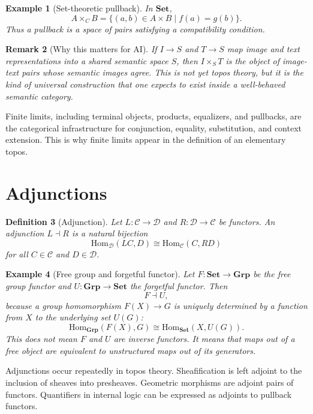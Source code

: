 \documentclass[11pt]{article}
\newtheorem{definition}{Definition}[section]
\newtheorem{remark}[definition]{Remark}
\newtheorem{example}[definition]{Example}
\newcommand{\Set}{\mathbf{Set}}
\newcommand{\Grp}{\mathbf{Grp}}
\newcommand{\Hom}{\mathrm{Hom}}
\begin{document}
\begin{example}[Set-theoretic pullback]
In \(\Set\),
\[
A\times_C B=\{(a,b)\in A\times B\mid f(a)=g(b)\}.
\]
Thus a pullback is a space of pairs satisfying a compatibility condition.
\end{example}

\begin{remark}[Why this matters for AI]
If \(I\to S\) and \(T\to S\) map image and text representations into a shared
semantic space \(S\), then \(I\times_S T\) is the object of image-text pairs
whose semantic images agree. This is not yet topos theory, but it is the kind of
universal construction that one expects to exist inside a well-behaved semantic
category.
\end{remark}

Finite limits, including terminal objects, products, equalizers, and pullbacks,
are the categorical infrastructure for conjunction, equality, substitution, and
context extension. This is why finite limits appear in the definition of an
elementary topos.

\section{Adjunctions}

\begin{definition}[Adjunction]
Let \(L:\mathcal C\to\mathcal D\) and \(R:\mathcal D\to\mathcal C\) be functors.
An adjunction \(L\dashv R\) is a natural bijection
\[
\Hom_{\mathcal D}(L C,D)\cong \Hom_{\mathcal C}(C,RD)
\]
for all \(C\in\mathcal C\) and \(D\in\mathcal D\).
\end{definition}

\begin{example}[Free group and forgetful functor]
Let \(F:\Set\to\Grp\) be the free group functor and
\(U:\Grp\to\Set\) the forgetful functor. Then
\[
F\dashv U,
\]
because a group homomorphism \(F(X)\to G\) is uniquely determined by a function
from \(X\) to the underlying set \(U(G)\):
\[
\Hom_{\Grp}(F(X),G)\cong \Hom_{\Set}(X,U(G)).
\]
This does not mean \(F\) and \(U\) are inverse functors. It means that maps out
of a free object are equivalent to unstructured maps out of its generators.
\end{example}

Adjunctions occur repeatedly in topos theory. Sheafification is left adjoint to
the inclusion of sheaves into presheaves. Geometric morphisms are adjoint pairs
of functors. Quantifiers in internal logic can be expressed as adjoints to
pullback functors.
\end{document}
